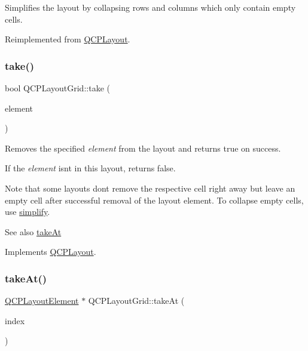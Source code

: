 Simplifies the layout by collapsing rows and columns which only contain empty cells. 

Reimplemented from \mbox{\hyperlink{class_q_c_p_layout_a41e6ac049143866e8f8b4964efab01b2}{Q\+C\+P\+Layout}}.

\mbox{\label{class_q_c_p_layout_grid_aee961c2eb6cf8a85dcbc5a7d7b6c1a00}} 
\subsubsection{\texorpdfstring{take()}{take()}}
{\footnotesize\ttfamily bool Q\+C\+P\+Layout\+Grid\+::take (\begin{DoxyParamCaption}\item[{\mbox{\hyperlink{class_q_c_p_layout_element}{Q\+C\+P\+Layout\+Element}} $\ast$}]{element }\end{DoxyParamCaption})\hspace{0.3cm}{\ttfamily [virtual]}}

Removes the specified {\itshape element} from the layout and returns true on success.

If the {\itshape element} isn\textquotesingle{}t in this layout, returns false.

Note that some layouts don\textquotesingle{}t remove the respective cell right away but leave an empty cell after successful removal of the layout element. To collapse empty cells, use \mbox{\hyperlink{class_q_c_p_layout_grid_a38621ca7aa633b6a9a88617df7f08672}{simplify}}.

\begin{DoxySeeAlso}{See also}
\mbox{\hyperlink{class_q_c_p_layout_grid_a17dd220234d1bbf8835abcc666384d45}{take\+At}} 
\end{DoxySeeAlso}


Implements \mbox{\hyperlink{class_q_c_p_layout_ada26cd17e56472b0b4d7fbbc96873e4c}{Q\+C\+P\+Layout}}.

\mbox{\label{class_q_c_p_layout_grid_a17dd220234d1bbf8835abcc666384d45}} 
\subsubsection{\texorpdfstring{takeAt()}{takeAt()}}
{\footnotesize\ttfamily \mbox{\hyperlink{class_q_c_p_layout_element}{Q\+C\+P\+Layout\+Element}} $\ast$ Q\+C\+P\+Layout\+Grid\+::take\+At (\begin{DoxyParamCaption}\item[{int}]{index }\end{DoxyParamCaption})\hspace{0.3cm}{\ttfamily [virtual]}}

